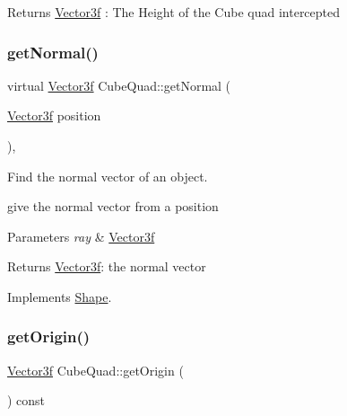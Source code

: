 \begin{DoxyReturn}{Returns}
\mbox{\hyperlink{class_vector3f}{Vector3f}} \+: The Height of the Cube quad intercepted 
\end{DoxyReturn}
\mbox{\label{class_cube_quad_aba1f984ce9580e2e430ace0137a0f249}} 
\subsubsection{\texorpdfstring{get\+Normal()}{getNormal()}}
{\footnotesize\ttfamily virtual \mbox{\hyperlink{class_vector3f}{Vector3f}} Cube\+Quad\+::get\+Normal (\begin{DoxyParamCaption}\item[{\mbox{\hyperlink{class_vector3f}{Vector3f}}}]{position }\end{DoxyParamCaption})\hspace{0.3cm}{\ttfamily [inline]}, {\ttfamily [virtual]}}



Find the normal vector of an object. 

give the normal vector from a position 
\begin{DoxyParams}{Parameters}
{\em ray} & \mbox{\hyperlink{class_vector3f}{Vector3f}} \\
\hline
\end{DoxyParams}
\begin{DoxyReturn}{Returns}
\mbox{\hyperlink{class_vector3f}{Vector3f}}\+: the normal vector 
\end{DoxyReturn}


Implements \mbox{\hyperlink{class_shape_afba80076ff9eb95f7e7c4144e323590f}{Shape}}.

\mbox{\label{class_cube_quad_abe8372c7f59cd9ff9a5a668fcd437a76}} 
\subsubsection{\texorpdfstring{get\+Origin()}{getOrigin()}}
{\footnotesize\ttfamily \mbox{\hyperlink{class_vector3f}{Vector3f}} Cube\+Quad\+::get\+Origin (\begin{DoxyParamCaption}{ }\end{DoxyParamCaption}) const\hspace{0.3cm}{\ttfamily [inline]}}

